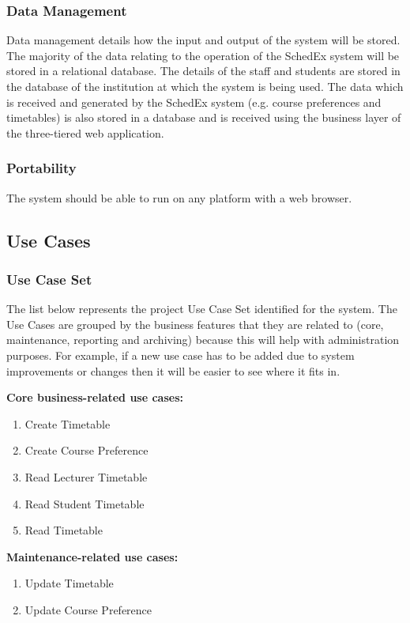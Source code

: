\documentclass{article}
\begin{document}
\subsubsection{Data Management}

Data management details how the input and output of the system will be stored. The majority of the data relating to the operation of the SchedEx system will be stored in a relational database. The details of the staff and students are stored in the database of the institution at which the system is being used. The data which is received and generated by the SchedEx system (e.g. course preferences and timetables) is also stored in a database and is received using the business layer of the three-tiered web application.

\subsubsection{Portability}

The system should be able to run on any platform with a web browser.

\subsection{Use Cases}

\subsubsection{Use Case Set}

The list below represents the project Use Case Set identified for the system. The Use Cases are grouped by the business features that they are related to (core, maintenance, reporting and archiving) because this will help with administration purposes. For example, if a new use case has to be added due to system improvements or changes then it will be easier to see where it fits in.

\textbf{Core business-related use cases:}
\begin{enumerate}[nosep]
\item Create Timetable
\item Create Course Preference
\item Read Lecturer Timetable
\item Read Student Timetable 
\item Read Timetable
\end{enumerate}

\textbf{Maintenance-related use cases:}
\begin{enumerate}
\item Update Timetable
\item Update Course Preference
\end{enumerate}
\end{document}

